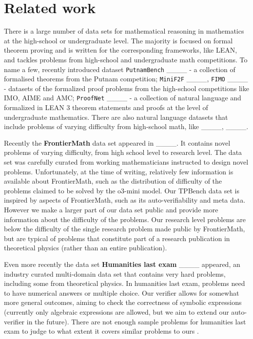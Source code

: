 \section{Related work}
\label{sec:relatedwork}

\iffalse
There is a large number of data sets for mathematical reasoning in mathematics at the high-school or undergraduate level. The majority is focused on formal theorem proving and is written for the corresponding frameworks, like LEAN, and tackles problems from high-school and undergraduate math competitions. To name a few, recently introduced dataset \texttt{PutnamBench} ____ - a collection of formalised theorems from the Putnam competition; \texttt{MiniF2F} ____, \texttt{FIMO} ____ - datasets of the formalized proof problems from the high-school competitions like IMO, AIME and AMC; \texttt{ProofNet} ____ - a collection of natural language and formalized in LEAN 3 theorem statements and proofs at the level of undergraduate mathematics. There are also natural language datasets that include problems of varying difficulty from high-school math, like ____, ____.  

Recently the \textbf{FrontierMath} data set appeared in ____. It contains novel problems of varying difficulty, from high school level to research level. The data set was carefully curated from working mathematicians instructed to design novel problems. Unfortunately, at the time of writing, relatively few information is available about FrontierMath, such as the distribution of difficulty of the problems claimed to be solved by the o3-mini model. Our TPBench data set is inspired by aspects of FrontierMath, such as its auto-verifiability and meta data. However we make a larger part of our data set public and provide more information about the difficulty of the problems. Our research level problems are below the difficulty of the single research problem made public by FrontierMath, but are typical of problems that constitute part of a research publication in theoretical physics (rather than an entire publication). 

Even more recently the data set \textbf{Humanities last exam} ____ appeared, an industry curated multi-domain data set that contains very hard problems, including some from theoretical physics. In humanities last exam, problems need to have numerical answers or multiple choice. Our verifier allows for somewhat more general outcomes, aiming to check the correctness of symbolic expressions (currently only algebraic expressions are allowed, but we aim to extend our auto-verifier in the future). There are not enough sample problems for humanities last exam to judge to what extent it covers similar problems to ours . 

